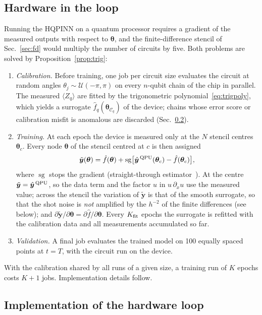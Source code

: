 \documentclass[floatfix,aps,pra,twocolumn,showpacs,superscriptaddress,10pt,nofootinbib]{revtex4-2}
\newcommand{\sg}{\operatorname{sg}}
\begin{document}
\begin{appendices}
\subsection{Hardware in the loop}\label{sec:hil}
Running the HQPINN on a quantum processor requires a gradient of the measured outputs with respect to $\bm\theta$, and the finite-difference stencil of Sec.~\ref{sec:fd} would multiply the number of circuits by five. Both problems are solved by Proposition~\ref{prop:trig}:
\begin{enumerate}
  \item \emph{Calibration.} Before training, one job per circuit size evaluates the circuit at random angles $\theta_j\sim\mathcal U(-\pi,\pi)$ on every $n$-qubit chain of the chip in parallel. The measured $\langle Z_q\rangle$ are fitted by the trigonometric polynomial~\eqref{eq:trigpoly}, which yields a surrogate $\hat f_q(\bm\theta_{\mathcal C_q})$ of the device; chains whose error score or calibration misfit is anomalous are discarded (Sec.~\ref{sec:hil_impl}).
  \item \emph{Training.} At each epoch the device is measured only at the $N$ stencil centres $\bm\theta_c$. Every node $\bm\theta$ of the stencil centred at $c$ is then assigned
  \begin{equation}
    \tilde{\bm y}(\bm\theta)=\hat f(\bm\theta)+\sg\!\big[\hat{\bm y}^{\,\rm QPU}(\bm\theta_c)-\hat f(\bm\theta_c)\big],
    \label{eq:ste}
  \end{equation}
  where $\sg$ stops the gradient (straight-through estimator~\cite{bengio2013estimating}). At the centre $\tilde{\bm y}=\hat{\bm y}^{\,\rm QPU}$, so the data term and the factor $u$ in $u\,\partial_xu$ use the measured value; across the stencil the variation of $\tilde{\bm y}$ is that of the smooth surrogate, so that the shot noise is \emph{not} amplified by the $h^{-2}$ of the finite differences (see below); and $\partial\tilde{\bm y}/\partial\bm\theta=\partial\hat f/\partial\bm\theta$. Every $K_{\rm fit}$ epochs the surrogate is refitted with the calibration data and all measurements accumulated so far.
  \item \emph{Validation.} A final job evaluates the trained model on 100 equally spaced points at $t=T$, with the circuit run on the device.
\end{enumerate}
With the calibration shared by all runs of a given size, a training run of $K$ epochs costs $K+1$ jobs. Implementation details follow.

\subsection{Implementation of the hardware loop}\label{sec:hil_impl}

\end{appendices}
\end{document}

